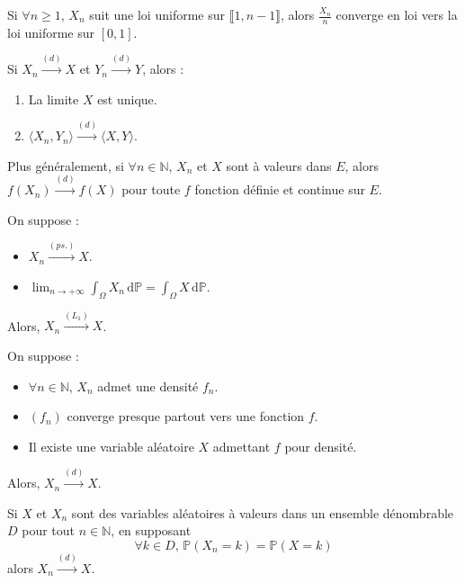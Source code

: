 	\begin{example}
		Si $\forall n \geq 1$, $X_n$ suit une loi uniforme sur $\llbracket 1, n-1 \rrbracket$, alors $\frac{X_n}{n}$ converge en loi vers la loi uniforme sur $[0,1]$.
	\end{example}
	
	
	\begin{proposition}
		Si $X_n \overset{(d)}{\longrightarrow} X$ et $Y_n \overset{(d)}{\longrightarrow} Y$, alors :
		\begin{enumerate}[label=(\roman*)]
			\item La limite $X$ est unique.
			\item $\langle X_n, Y_n \rangle \overset{(d)}{\longrightarrow} \langle X, Y \rangle$.
		\end{enumerate}
		Plus généralement, si $\forall n \in \mathbb{N}$, $X_n$ et $X$ sont à valeurs dans $E$, alors $f(X_n) \overset{(d)}{\longrightarrow} f(X)$ pour toute $f$ fonction définie et continue sur $E$.
	\end{proposition}
	
	\begin{theorem}
		On suppose :
		\begin{itemize}
			\item $X_n \overset{(ps.)}{\longrightarrow} X$.
			\item $\lim_{n \rightarrow +\infty} \int_\Omega X_n \, \mathrm{d}\mathbb{P} = \int_\Omega X \, \mathrm{d}\mathbb{P}$.
		\end{itemize}
		Alors, $X_n \overset{(L_1)}{\longrightarrow} X$.
	\end{theorem}
	
	\begin{corollary}
		On suppose :
		\begin{itemize}
			\item $\forall n \in \mathbb{N}$, $X_n$ admet une densité $f_n$.
			\item $(f_n)$ converge presque partout vers une fonction $f$.
			\item Il existe une variable aléatoire $X$ admettant $f$ pour densité.
		\end{itemize}
		Alors, $X_n \overset{(d)}{\longrightarrow} X$.
	\end{corollary}
	
	\begin{corollary}
		Si $X$ et $X_n$ sont des variables aléatoires à valeurs dans un ensemble dénombrable $D$ pour tout $n \in \mathbb{N}$, en supposant
		\[ \forall k \in D, \, \mathbb{P}(X_n = k) = \mathbb{P}(X = k) \]
		alors $X_n \overset{(d)}{\longrightarrow} X$.
	\end{corollary}
	
